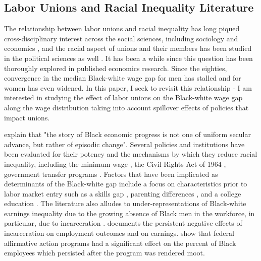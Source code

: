 \documentclass[11pt]{article}
\begin{document}
\subsection{Labor Unions and Racial Inequality Literature}
The relationship between labor unions and racial inequality has long piqued cross-disciplinary interest across the social sciences, including sociology \citep[see, for example,][]{rosenfeldkleykamp2012, mccall2001} and economics \citep[see, for example,][]{ashenfelter1972, boundfreeman1992}, and the racial aspect of unions and their members has been studied in the political sciences as well \citep[see, for example,][]{frymergrumbach2020}. It has been a while since this question has been thoroughly explored in published economics research. Since the eighties, convergence in the median Black-white wage gap for men has stalled and for women has even widened. In this paper, I seek to revisit this relationship - I am interested in studying the effect of labor unions on the Black-white wage gap along the wage distribution taking into account spillover effects of policies that impact unions.

\citet{donohueheckman1991} explain that "the story of Black economic progress is not one of uniform secular advance, but rather of episodic change". Several policies and institutions have been evaluated for their potency and the mechanisms by which they reduce racial inequality, including the minimum wage \citep[see, for example,][]{derenoncourtmontialoux2020}, the Civil Rights Act of 1964 \citep[see, for example,][]{heckmanpayner1989, fgbh1973}, government transfer programs \citep[see, for example,][]{butlerheckman1977}. Factors that have been implicated as determinants of the Black-white gap include a focus on characteristics prior to labor market entry such as a skills gap \citep[see, for example,][]{nealjohnson1996}, parenting differences \citep[see, for example,][]{abhs2015}, and a college education \citep[see, for example,][]{abh2010}. The literature also alludes to under-representations of Black-white earnings inequality due to the growing absence of Black men in the workforce, in particular, due to incarceration \citep[see, for example][]{bayercharles2018, nealrick2014}. \citet{muellersmith2015} documents the persistent negative effects of incarceration on employment outcomes and on earnings. \citet{miller2017} show that federal affirmative action programs had a significant effect on the percent of Black employees which persisted after the program was rendered moot.
\end{document}
